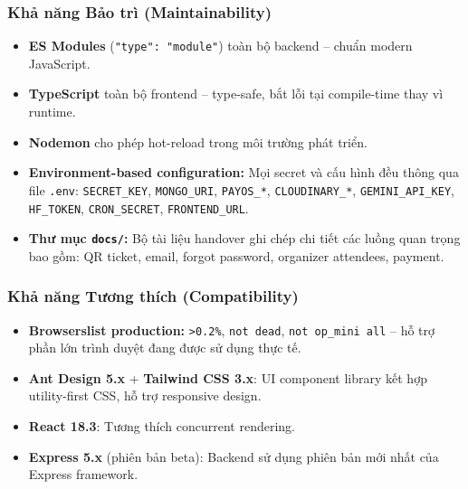 \subsubsection{Khả năng Bảo trì (Maintainability)}

\begin{itemize}[leftmargin=*, label={--}]
    \item \textbf{ES Modules} (\texttt{"type": "module"}) toàn bộ backend --
    chuẩn modern JavaScript.

    \item \textbf{TypeScript} toàn bộ frontend -- type-safe, bắt lỗi tại
    compile-time thay vì runtime.

    \item \textbf{Nodemon} cho phép hot-reload trong môi trường phát triển.

    \item \textbf{Environment-based configuration:} Mọi secret và cấu hình
    đều thông qua file \texttt{.env}:
    \texttt{SECRET\_KEY}, \texttt{MONGO\_URI}, \texttt{PAYOS\_*},
    \texttt{CLOUDINARY\_*}, \texttt{GEMINI\_API\_KEY}, \texttt{HF\_TOKEN},
    \texttt{CRON\_SECRET}, \texttt{FRONTEND\_URL}.

    \item \textbf{Thư mục \texttt{docs/}:} Bộ tài liệu handover ghi chép
    chi tiết các luồng quan trọng bao gồm: QR ticket, email, forgot
    password, organizer attendees, payment.
\end{itemize}

\subsubsection{Khả năng Tương thích (Compatibility)}

\begin{itemize}[leftmargin=*, label={--}]
    \item \textbf{Browserslist production:} \texttt{>0.2\%},
    \texttt{not dead}, \texttt{not op\_mini all} -- hỗ trợ phần lớn trình
    duyệt đang được sử dụng thực tế.

    \item \textbf{Ant Design 5.x} + \textbf{Tailwind CSS 3.x}: UI component
    library kết hợp utility-first CSS, hỗ trợ responsive design.

    \item \textbf{React 18.3}: Tương thích concurrent rendering.

    \item \textbf{Express 5.x} (phiên bản beta): Backend sử dụng phiên bản
    mới nhất của Express framework.
\end{itemize}

